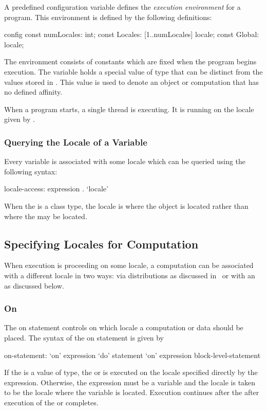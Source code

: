 A predefined configuration variable defines the {\em execution
environment} for a program.  This environment is defined by the
following definitions:
\begin{chapel}
config const numLocales: int;
const Locales: [1..numLocales] locale;
const Global: locale;
\end{chapel}
The environment consists of constants which are fixed when the program
begins execution.  The variable  holds a special value
of  type that can be distinct from the values stored
in . This value is used to denote an object or
computation that has no defined affinity.

When a program starts, a single thread is executing.  It is running on
the locale given by .

\subsubsection{Querying the Locale of a Variable}
\label{Querying_the_Locale_of_a_Variable}

Every variable  is associated with some locale which can be
queried using the following syntax:
\begin{syntax}
locale-access:
  expression . `locale'
\end{syntax}
When the  is a class type, the locale is where the
object is located rather than where the  may be
located.

\subsection{Specifying Locales for Computation}
\label{Specifying_Locales_for_Computation}

When execution is proceeding on some locale, a computation can be
associated with a different locale in two ways: via distributions as
discussed in~ or with an  as
discussed below.

\subsubsection{On}
\label{On}

The on statement controls on which locale a computation or data should
be placed.  The syntax of the on statement is given by
\begin{syntax}
on-statement:
  `on' expression `do' statement
  `on' expression block-level-statement
\end{syntax}
If the  is a value of  type,
the  or  is executed on
the locale specified directly by the expression.  Otherwise, the
expression must be a variable and the locale is taken to be the locale
where the variable is located.  Execution continues after
the  after execution of the 
or  completes.

